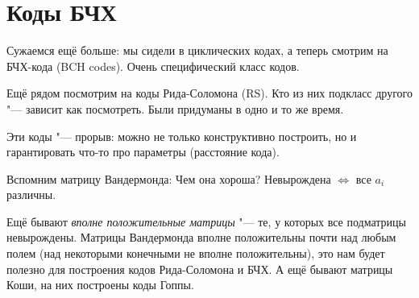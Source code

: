\section{Коды БЧХ}
Сужаемся ещё больше: мы сидели в циклических кодах,
а теперь смотрим на БЧХ-кода (BCH codes).
Очень специфический класс кодов.

Ещё рядом посмотрим на коды Рида-Соломона (RS).
Кто из них подкласс другого "--- зависит как посмотреть.
Были придуманы в одно и то же время.

Эти коды "--- прорыв: можно не только конструктивно
построить, но и гарантировать что-то про параметры
(расстояние кода).

Вспомним матрицу Вандермонда:
\TODO
Чем она хороша?
Невырождена $\iff$ все $a_i$ различны.

Ещё бывают \textit{вполне положительные матрицы} "--- те, у которых
все подматрицы невырождены.
Матрицы Вандермонда вполне положительны почти над любым полем
(над некоторыми конечными не вполне положительны), это нам будет полезно
для построения кодов Рида-Соломона и БЧХ.
А ещё бывают матрицы Коши, на них построены коды Гоппы.

